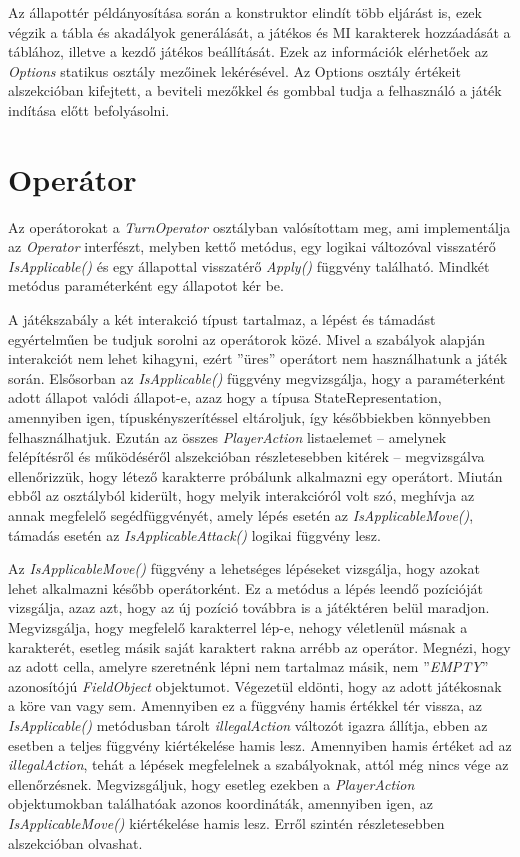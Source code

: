 \documentclass[
]{thesis-ekf}
\theoremstyle{definition}
\theoremstyle{remark}
\begin{document}
Az állapottér példányosítása során a konstruktor elindít több eljárást is, ezek végzik a tábla és akadályok generálását, a játékos és MI karakterek hozzáadását a táblához, illetve a kezdő játékos beállítását. Ezek az információk elérhetőek az \emph{Options} statikus osztály mezőinek lekérésével. Az Options osztály értékeit  alszekcióban kifejtett, a beviteli mezőkkel és gombbal tudja a felhasználó a játék indítása előtt befolyásolni.

\section{Operátor} \label{operator}

Az operátorokat a \emph{TurnOperator} osztályban valósítottam meg, ami implementálja az \emph{Operator} interfészt, melyben kettő metódus, egy logikai változóval visszatérő \emph{IsApplicable()} és egy állapottal visszatérő \emph{Apply()} függvény található. Mindkét metódus paraméterként egy állapotot kér be.

A játékszabály a két interakció típust tartalmaz, a lépést és támadást egyértelműen be tudjuk sorolni az operátorok közé. Mivel a szabályok alapján interakciót nem lehet kihagyni, ezért ''üres'' operátort nem használhatunk a játék során. Elsősorban az \emph{IsApplicable()} függvény megvizsgálja, hogy a paraméterként adott állapot valódi állapot-e, azaz hogy a típusa StateRepresentation, amennyiben igen, típuskényszerítéssel eltároljuk, így későbbiekben könnyebben felhasználhatjuk. Ezután az összes \emph{PlayerAction} listaelemet -- amelynek felépítésről és működéséről  alszekcióban részletesebben kitérek -- megvizsgálva ellenőrizzük, hogy létező karakterre próbálunk alkalmazni egy operátort. Miután ebből az osztályból kiderült, hogy melyik interakcióról volt szó, meghívja az annak megfelelő segédfüggvényét, amely lépés esetén az \emph{IsApplicableMove()}, támadás esetén az \emph{IsApplicableAttack()} logikai függvény lesz.

Az \emph{IsApplicableMove()} függvény a lehetséges lépéseket vizsgálja, hogy azokat lehet alkalmazni később operátorként. Ez a metódus a lépés leendő pozícióját vizsgálja, azaz azt, hogy az új pozíció továbbra is a játéktéren belül maradjon. Megvizsgálja, hogy megfelelő karakterrel lép-e, nehogy véletlenül másnak a karakterét, esetleg másik saját karaktert rakna arrébb az operátor. Megnézi, hogy az adott cella, amelyre szeretnénk lépni nem tartalmaz másik, nem ''\emph{EMPTY}'' azonosítójú \emph{FieldObject} objektumot. Végezetül eldönti, hogy az adott játékosnak a köre van vagy sem. Amennyiben ez a függvény hamis értékkel tér vissza, az \emph{IsApplicable()} metódusban tárolt \emph{illegalAction} változót igazra állítja, ebben az esetben a teljes függvény kiértékelése hamis lesz. Amennyiben hamis értéket ad az \emph{illegalAction}, tehát a lépések megfelelnek a szabályoknak, attól még nincs vége az ellenőrzésnek. Megvizsgáljuk, hogy esetleg ezekben a \emph{PlayerAction} objektumokban találhatóak azonos koordináták, amennyiben igen, az \emph{IsApplicableMove()} kiértékelése hamis lesz. Erről szintén részletesebben  alszekcióban olvashat.
\end{document}
